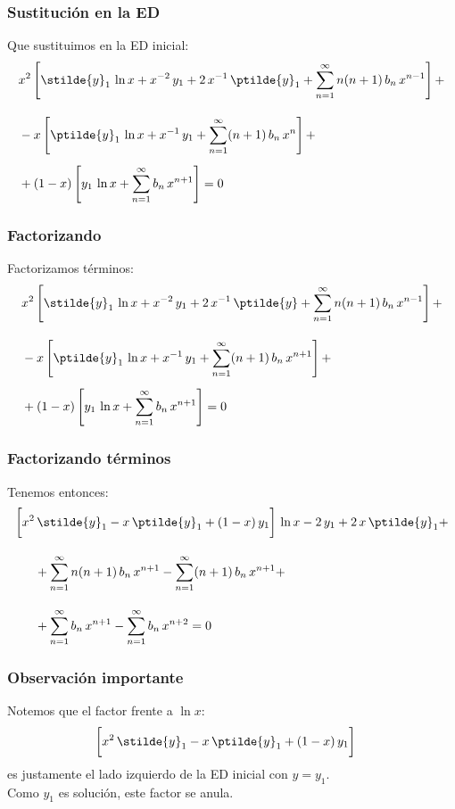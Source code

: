 \begin{frame}
\frametitle{Sustitución en la ED}
Que sustituimos en la ED inicial:
\begin{align*}
&x^{2} \left[ \stilde{y}_{1} \, \ln x + x^{-2} \, y_{1} + 2 \, x^{-1} \, \ptilde{y}_{1} + \sum_{n=1}^{\infty} n (n + 1) \, b_{n} \, x^{n-1} \right] + \\[1em]
&- x \left[ \ptilde{y}_{1} \, \ln x + x^{-1} \, y_{1} + \sum_{n=1}^{\infty} (n + 1) \, b_{n} \, x^{n} \right] + \\[0.5em]
&+ (1 - x) \left[ y_{1} \, \ln x + \sum_{n=1}^{\infty} b_{n} \, x^{n+1} \right] = 0
\end{align*}
\end{frame}
\begin{frame}
\frametitle{Factorizando}
Factorizamos términos:
\fontsize{12}{12}\selectfont
\begin{align*}
&x^{2} \left[ \stilde{y}_{1} \, \ln x + x^{-2} \, y_{1} + 2 \, x^{-1} \, \ptilde{y} + \sum_{n=1}^{\infty} n (n + 1) \, b_{n} \, x^{n-1} \right] + \\[1em]
&- x \left[ \ptilde{y}_{1} \, \ln x + x^{-1} \, y_{1} + \sum_{n=1}^{\infty} (n + 1) \, b_{n} \, x^{n+1} \right] + \\[0.5em]
&+ (1 - x) \left[ y_{1} \, \ln x + \sum_{n=1}^{\infty} b_{n} \, x^{n+1} \right] = 0
\end{align*}
\end{frame}
\begin{frame}
\frametitle{Factorizando términos}
Tenemos entonces:
\begin{align*}
\bigg[ x^{2} &\, \stilde{y}_{1} - x \, \ptilde{y}_{1} + (1 - x) \, y_{1} \bigg] \, \ln x - 2 \, y_{1} +  2 \, x \, \ptilde{y}_{1} + \\[1em]
& + \sum_{n=1}^{\infty} n (n + 1) \, b_{n} \, x^{n+1} - \sum_{n=1}^{\infty} (n + 1) \, b_{n} \, x^{n+1} + \\[1em]
&+ \sum_{n=1}^{\infty} b_{n} \, x^{n+1} - \sum_{n=1}^{\infty} b_{n} \, x^{n+2} = 0
\end{align*} 
\end{frame}
\begin{frame}
\frametitle{Observación importante}
Notemos que el factor frente a $\ln x$:
\begin{align*}
\bigg[ x^{2} &\, \stilde{y}_{1} - x \, \ptilde{y}_{1} + (1 - x) \, y_{1} \bigg]
\end{align*}
es justamente el lado izquierdo de la ED inicial con $y = y_{1}$.
\\
\bigskip
Como $y_{1}$ es solución, este factor se anula.
\end{frame}
